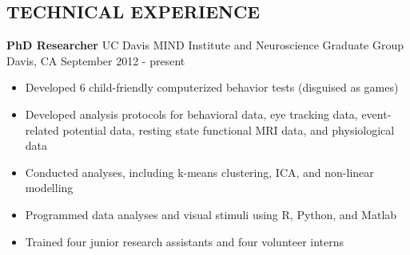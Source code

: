 \documentclass[line,margin,10pt]{res}
\begin{document}
\begin{resume}



\section{TECHNICAL EXPERIENCE}
\textbf{PhD Researcher} \hfill UC Davis MIND Institute and Neuroscience Graduate Group\\ 
Davis, CA \hfill September 2012 - present
\begin{itemize} \itemsep -2pt
\item Developed 6 child-friendly computerized behavior tests (disguised as games)
\item Developed analysis protocols for behavioral data, eye tracking data, event-related potential data, resting state functional MRI data, and physiological data
\item Conducted analyses, including k-means clustering, ICA, and non-linear modelling
\item Programmed data analyses and visual stimuli using R, Python, and Matlab
\item Trained four junior research assistants and four volunteer interns
\end{itemize}


\end{resume}
\end{document}
